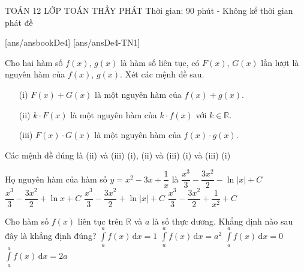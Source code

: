 ﻿\begin{name}
	{\tenchude}
	{TOÁN 12}
	{LỚP TOÁN THẦY PHÁT}
	{Thời gian: 90 phút - Không kể thời gian phát đề}
\end{name}
[ans/ansbookDe4]
\TN
{}[ans/ansDe4-TN1]
\begin{ex}%
Cho hai hàm số $f(x)$, $g(x)$ là hàm số liên tục, có $F(x)$, $G(x)$ lần lượt là nguyên hàm của $f(x)$, $g(x)$. Xét các mệnh đề sau.
\begin{itemize}
\item[(i)] $F(x)+G(x)$ là một nguyên hàm của $f(x)+g(x)$.
\item[(ii)] $k\cdot F(x)$ là một nguyên hàm của $k\cdot f(x)$ với $k\in\mathbb{R}$.
\item[(iii)] $F(x)\cdot G(x)$ là một nguyên hàm của $f(x)\cdot g(x)$.
\end{itemize}
Các mệnh đề đúng là
\choice
{(ii) và (iii)}
{(i), (ii) và (iii)}
{(i) và (iii)}
{\True (i)}
\end{ex}

\begin{ex}%
Họ nguyên hàm của hàm số $y=x^2-3x+\dfrac{1}{x}$ là
\choice
{$\dfrac{x^3}{3}-\dfrac{3x^2}{2}-\ln\left|x\right|+C$}
{$\dfrac{x^3}{3}-\dfrac{3x^2}{2}+\ln x+C$}
{\True $\dfrac{x^3}{3}-\dfrac{3x^2}{2}+\ln\left|x\right|+C$}
{$\dfrac{x^3}{3}-\dfrac{3x^2}{2}+\dfrac{1}{x^2}+C$}
\end{ex}

\begin{ex}%
Cho hàm số $f(x)$ liên tục trên $\mathbb{R}$ và $a$ là số thực dương. Khẳng định nào sau đây là khẳng định đúng?
\choice
{$\displaystyle\int\limits_a^a f(x) \mathrm{\,d}x=1$}
{$\displaystyle\int\limits_a^af(x) \mathrm{\,d}x=a^2$}
{\True $\displaystyle\int\limits_a^af(x) \mathrm{\,d}x=0$}
{$\displaystyle\int\limits_a^a f(x) \mathrm{\,d}x=2a$}
\end{ex}


